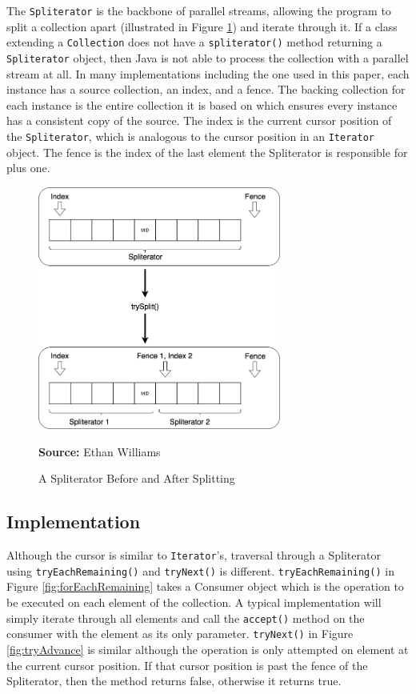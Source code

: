\documentclass[oneside, 12pt]{article}
\newcommand{\source}[1]{\textbf{Source:} {#1} }
\begin{document}
The \verb|Spliterator| is the backbone of parallel streams, allowing the program to split a collection apart (illustrated in Figure \ref{fig:split}) and iterate through it. If a class extending a \verb|Collection| does not have a \verb|spliterator()| method returning a \verb|Spliterator| object, then Java is not able to process the collection with a parallel stream at all. In many implementations including the one used in this paper, each instance has a source collection, an index, and a fence. The backing collection for each instance is the entire collection it is based on which ensures every instance has a consistent copy of the source. The index is the current cursor position of the \verb|Spliterator|, which is analogous to the cursor position in an \verb|Iterator| object. The fence is the index of the last element the Spliterator is responsible for plus one.

\begin{figure}[H]
\centering
\includegraphics[width=8cm]{images/spliterator_illustrated.png}
\caption{A Spliterator Before and After Splitting}
\source{Ethan Williams}
\label{fig:split}
\end{figure}

\subsection{Implementation} 
Although the cursor is similar to \verb|Iterator|'s, traversal through a Spliterator using \verb|tryEachRemaining()| and \verb|tryNext()| is different. \verb|tryEachRemaining()| in Figure \ref{fig:forEachRemaining} takes a Consumer object which is the operation to be executed on each element of the collection. A typical implementation will simply iterate through all elements and call the \verb|accept()| method on the consumer with the element as its only parameter. \verb|tryNext()| in Figure \ref{fig:tryAdvance} is similar although the operation is only attempted on element at the current cursor position. If that cursor position is past the fence of the Spliterator, then the method returns false, otherwise it returns true.
\end{document}
